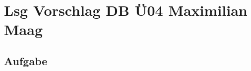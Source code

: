\documentclass{article}
\begin{document}
	\section*{Lsg Vorschlag DB Ü04 Maximilian Maag}
	\subsection*{Aufgabe }
\end{document}
